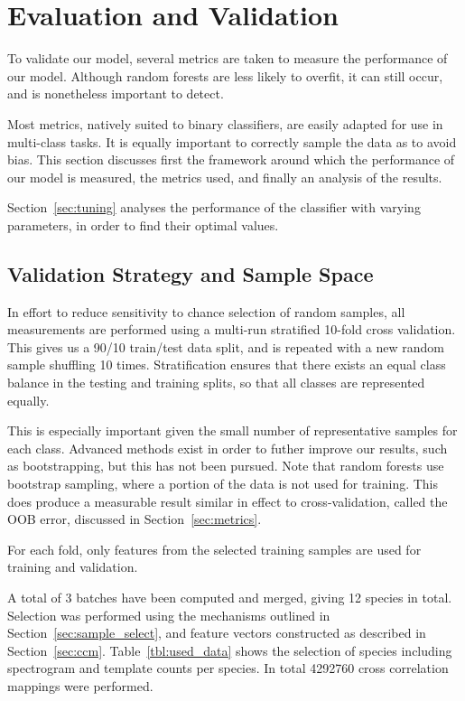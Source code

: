 \section{ Evaluation and Validation}\label{sec:acc_eval}
To validate our model, several metrics are taken to measure the performance of
our model.
Although random forests are less likely to overfit, it can still occur, and is
nonetheless important to detect.

Most metrics, natively suited to binary classifiers, are easily adapted for use
in multi-class tasks.
It is equally important to correctly sample the data as to avoid bias.
This section discusses first the framework around which the performance of our
model is measured, the metrics used, and finally an analysis of the results.

Section~\ref{sec:tuning} analyses the performance of the classifier with varying
parameters, in order to find their optimal values.

\subsection{Validation Strategy and Sample Space}
In effort to reduce sensitivity to chance selection of random samples, all
measurements are performed using a multi-run stratified 10-fold cross validation.
This gives us a 90/10 train/test data split, and is repeated with a new random
sample shuffling 10 times.
Stratification ensures that there exists an equal class balance in the testing
and training splits, so that all classes are represented equally.

This is especially important given the small number of representative samples
for each class.
Advanced methods exist in order to futher improve our results, such as
bootstrapping, but this has not been pursued.
Note that random forests use bootstrap sampling, where a portion of the data is
not used for training.
This does produce a measurable result similar in effect to cross-validation,
called the OOB error, discussed in Section~\ref{sec:metrics}.

For each fold, only features from the selected training samples are
used for training and validation.

A total of 3 batches have been computed and merged, giving 12 species in total.
Selection was performed using the mechanisms outlined in
Section~\ref{sec:sample_select}, and feature vectors constructed as described
in Section~\ref{sec:ccm}.
Table~\ref{tbl:used_data} shows the selection of species including spectrogram
and template counts per species.
In total 4292760 cross correlation mappings were performed.

